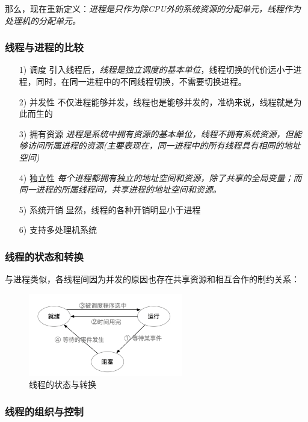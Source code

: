     那么，现在重新定义：\emph{进程是只作为除CPU外的系统资源的分配单元，线程作为处理机的分配单元。}

\subsubsection{线程与进程的比较}

\begin{itemize}
    \item [1)] 调度
    \subitem 引入线程后，\emph{线程是独立调度的基本单位}，线程切换的代价远小于进程，同时，在同一进程中的不同线程切换，不需要切换进程。
    \item [2)] 并发性
    \subitem 不仅进程能够并发，线程也是能够并发的，准确来说，线程就是为此而生的
    \item [3)] 拥有资源
    \subitem \emph{进程是系统中拥有资源的基本单位，线程不拥有系统资源，但能够访问所属进程的资源(主要表现在，同一进程中的所有线程具有相同的地址空间)}
    \item [4)] 独立性
    \subitem \emph{每个进程都拥有独立的地址空间和资源，除了共享的全局变量；而同一进程的所属线程间，共享进程的地址空间和资源。}
    \item [5)] 系统开销
    \subitem 显然，线程的各种开销明显小于进程
    \item [6)] 支持多处理机系统
\end{itemize}

\subsubsection{线程的状态和转换}

    与进程类似，各线程间因为并发的原因也存在共享资源和相互合作的制约关系：

\begin{figure}[!htbp]
    \centering
    \includegraphics[width=0.6\textwidth]{image/chapter02/线程的状态与转换.png}
    \caption{线程的状态与转换}
\end{figure}

\subsubsection{线程的组织与控制}

